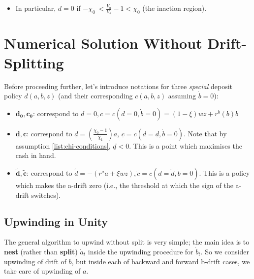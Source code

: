 \documentclass[11pt]{article}
\begin{document}
\begin{itemize}
\item In particular, \(d=0\) if \(-\chi_{0}\ < \frac{V_{a}}{V_{b}}-1 < \chi_0\) (the inaction region).
\end{itemize}


\section{Numerical Solution Without Drift-Splitting}
\label{sec:orgc9e633a}
Before proceeding further, let's introduce notations for three \emph{special} deposit policy \(d(a,b,z)\) (and their corresponding \(c(a,b,z)\) assuming \(\dot{b}=0\)):
\begin{itemize}
\item \(\mathbf{d_0, c_0}\): correspond to \(d=0, c=c(d=0, \dot{b}=0) = (1-\xi)w z+r^{b}(b)b\)
\item \(\mathbf{\underline{d}, \underline{c}}\): correspond to \(\underline{d} = \left( \frac{\chi_0-1}{\chi_1} \right)a\), \(\underline{c} = c(d=\underline{d}, \dot{b}=0)\). Note that by assumption \ref{list:chi-conditions}, \(\underline{d} < 0\). This is a point which maximises the cash in hand.
\item \(\mathbf{\tilde{d}, \tilde{c}}\): correspond to \(\tilde{d} = -(r^{a}a+\xi w z), \tilde{c} = c \left( d=\tilde{d}, \dot{b}=0 \right)\). This is a policy which makes the a-drift zero (i.e., the threshold at which the sign of the a-drift switches).
\end{itemize}


\subsection{Upwinding in Unity}
\label{sec:orgb5dd750}
The general algorithm to upwind without split is very simple; the main idea is to \textbf{nest} (rather than \textbf{split}) \(\dot{a}_t\) inside the upwinding procedure for \(\dot{b}_t\). So we consider upwinding of drift of \(b\), but inside each of backward and forward b-drift cases, we take care of upwinding of \(a\).
\end{document}
